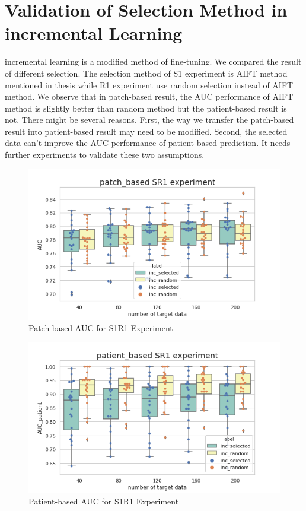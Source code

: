 \section{Validation of Selection Method in incremental Learning}
incremental learning is a modified method of fine-tuning. We compared the result of different selection. The selection method of S1 experiment is AIFT method mentioned in thesis \cite{zhou2017fine} while R1 experiment use random selection instead of AIFT method. 
We observe that in patch-based result, the AUC performance of AIFT method is slightly better than random method but the patient-based result is not. There might be several reasons. First, the way we transfer the patch-based result into patient-based result may need to be modified. Second, the selected data can't improve the AUC performance of patient-based prediction. It needs further experiments to validate these two assumptions.  

\begin{figure}[H]
    \hfil
    \begin{minipage}[t]{0.9\textwidth}
        \includegraphics[width=\textwidth]{fig/SR1_num_patch.png}
        \caption{\label{fig:parallel1} Patch-based AUC for S1R1 Experiment}
    \end{minipage}
    \hfil
\end{figure}
\begin{figure}[H]
    \hfil
    \begin{minipage}[t]{0.9\textwidth}
        \includegraphics[width=\textwidth]{fig/SR1_num_patient.png}
        \caption{\label{fig:parallel1} Patient-based AUC for S1R1 Experiment}
    \end{minipage}
    \hfil
\end{figure}


